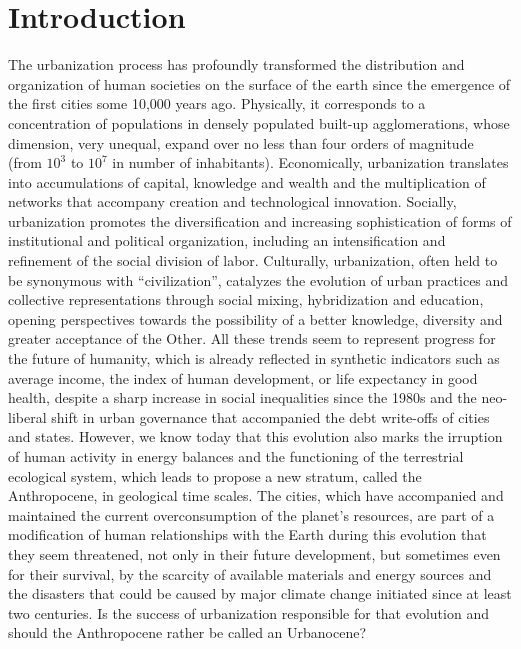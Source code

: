 \documentclass[11pt]{article}
\begin{document}
\section{Introduction}

The urbanization process has profoundly transformed the distribution and organization of human societies on the surface of the earth since the emergence of the first cities some 10,000 years ago. Physically, it corresponds to a concentration of populations in densely populated built-up agglomerations, whose dimension, very unequal, expand over no less than four orders of magnitude (from $10^3$ to $10^7$ in number of inhabitants). Economically, urbanization translates into accumulations of capital, knowledge and wealth and the multiplication of networks that accompany creation and technological innovation. Socially, urbanization promotes the diversification and increasing sophistication of forms of institutional and political organization, including an intensification and refinement of the social division of labor. Culturally, urbanization, often held to be synonymous with ``civilization'', catalyzes the evolution of urban practices and collective representations through social mixing, hybridization and education, opening perspectives towards the possibility of a better knowledge, diversity and greater acceptance of the Other. All these trends seem to represent progress for the future of humanity, which is already reflected in synthetic indicators such as average income, the index of human development, or life expectancy in good health, despite a sharp increase in social inequalities since the 1980s and the neo-liberal shift in urban governance that accompanied the debt write-offs of cities and states. However, we know today that this evolution also marks the irruption of human activity in energy balances and the functioning of the terrestrial ecological system, which leads to propose a new stratum, called the Anthropocene, in geological time scales. The cities, which have accompanied and maintained the current overconsumption of the planet's resources, are part of a modification of human relationships with the Earth during this evolution that they seem threatened, not only in their future development, but sometimes even for their survival, by the scarcity of available materials and energy sources and the disasters that could be caused by major climate change initiated since at least two centuries. Is the success of urbanization responsible for that evolution and should the Anthropocene rather be called an Urbanocene?
\end{document}
